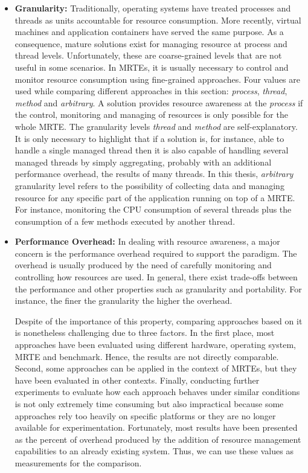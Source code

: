 \begin{itemize}
\item \textbf{Granularity:}
Traditionally, operating systems have treated processes and threads as units accountable for resource consumption.
More recently, virtual machines and application containers have served the same purpose.
As a consequence, mature solutions exist for managing resource at process and thread levels.
Unfortunately, these are coarse-grained levels that are not useful in some scenarios.
In MRTEs, it is usually necessary to control and monitor resource consumption using fine-grained approaches.
Four values are used while comparing different approaches in this section: \textit{process}, \textit{thread}, \textit{method} and \textit{arbitrary}.
A solution provides resource awareness at the \textit{process} if the control, monitoring and managing of resources is only possible for the whole MRTE.
The granularity levels \textit{thread} and \textit{method} are self-explanatory.
It is only necessary to highlight that if a solution is, for instance, able to handle a single managed thread then it is also capable of handling several managed threads by simply aggregating, probably with an additional performance overhead, the results of many threads.
In this thesis, \textit{arbitrary} granularity level refers to the possibility of collecting data and managing resource for any specific part of the application running on top of a MRTE.
For instance, monitoring the CPU consumption of several threads plus the consumption of a few methods executed by another thread.


\item \textbf{Performance Overhead:} 
In dealing with resource awareness, a major concern is the performance overhead required to support the paradigm.
The overhead is usually produced by the need of carefully monitoring and controlling how resources are used.
In general, there exist trade-offs between the performance and other properties such as granularity and portability.
For instance, the finer the granularity the higher the overhead.

Despite of the importance of this property, comparing approaches based on it is nonetheless challenging due to three factors.
In the first place, most approaches have been evaluated using different hardware, operating system, MRTE and benchmark.
Hence, the results are not directly comparable.  
Second, some approaches can be applied in the context of MRTEs, but they have been evaluated in other contexts.
Finally, conducting further experiments to evaluate how each approach behaves under similar conditions is not only extremely time consuming but also impractical because some approaches rely too heavily on specific platforms or they are no longer available for experimentation.
Fortunately, most results have been presented as the percent of overhead produced by the addition of resource management capabilities to an already existing system.
Thus, we can use these values as measurements for the comparison.


\end{itemize}
